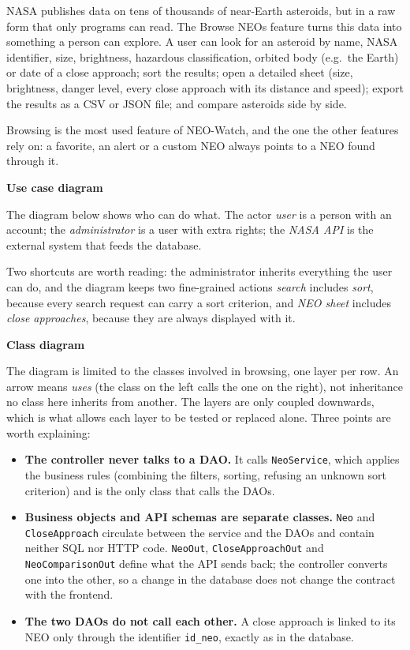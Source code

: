 \documentclass[
  french,
  11pt,
  a4paper,
]{report}
\providecommand{\tightlist}{%
  \setlength{\itemsep}{0pt}\setlength{\parskip}{0pt}}
\begin{document}
NASA publishes data on tens of thousands of near-Earth asteroids, but in
a raw form that only programs can read. The Browse NEOs feature turns
this data into something a person can explore. A user can look for an
asteroid by name, NASA identifier, size, brightness, hazardous
classification, orbited body (e.g.~the Earth) or date of a close
approach; sort the results; open a detailed sheet (size, brightness,
danger level, every close approach with its distance and speed); export
the results as a CSV or JSON file; and compare asteroids side by side.

Browsing is the most used feature of NEO-Watch, and the one the other
features rely on: a favorite, an alert or a custom NEO always points to
a NEO found through it.

\textbf{Use case diagram}

The diagram below shows who can do what. The actor \emph{user} is a
person with an account; the \emph{administrator} is a user with extra
rights; the \emph{NASA API} is the external system that feeds the
database.

Two shortcuts are worth reading: the administrator inherits everything
the user can do, and the diagram keeps two fine-grained actions
\emph{search} includes \emph{sort}, because every search request can
carry a sort criterion, and \emph{NEO sheet} includes \emph{close
approaches}, because they are always displayed with it.

\textbf{Class diagram}

The diagram is limited to the classes involved in browsing, one layer
per row. An arrow means \emph{uses} (the class on the left calls the one
on the right), not inheritance no class here inherits from another. The
layers are only coupled downwards, which is what allows each layer to be
tested or replaced alone. Three points are worth explaining:

\begin{itemize}
\tightlist
\item
  \textbf{The controller never talks to a DAO.} It calls
  \texttt{NeoService}, which applies the business rules (combining the
  filters, sorting, refusing an unknown sort criterion) and is the only
  class that calls the DAOs.
\item
  \textbf{Business objects and API schemas are separate classes.}
  \texttt{Neo} and \texttt{CloseApproach} circulate between the service
  and the DAOs and contain neither SQL nor HTTP code. \texttt{NeoOut},
  \texttt{CloseApproachOut} and \texttt{NeoComparisonOut} define what
  the API sends back; the controller converts one into the other, so a
  change in the database does not change the contract with the frontend.
\item
  \textbf{The two DAOs do not call each other.} A close approach is
  linked to its NEO only through the identifier \texttt{id\_neo},
  exactly as in the database.
\end{itemize}
\end{document}
